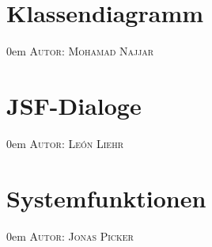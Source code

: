 \documentclass{article}
\makeatletter
\newcommand{\sectionauthor}[1]{
	{\parindent 0em \large \scshape Autor: #1 \par \nobreak \vspace*{1em}}
	\@afterheading
}
\makeatother
\begin{document}
\section{Klassendiagramm}
\sectionauthor{Mohamad Najjar}

\section{JSF-Dialoge}
\sectionauthor{León Liehr}

\section{Systemfunktionen}
\sectionauthor{Jonas Picker}
\end{document}
